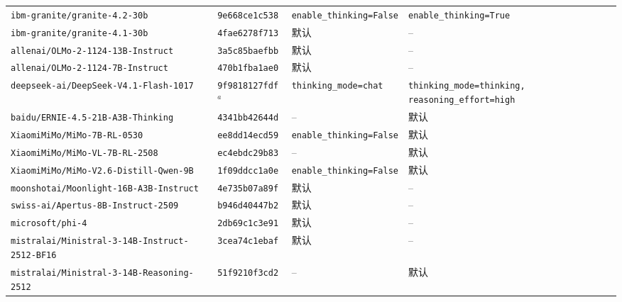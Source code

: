 \begin{table}[htbp]
\begin{tabular}{llp{3.2cm}p{3.5cm}}
\texttt{ibm-granite/granite-4.2-30b} & \texttt{9e668ce1c538} & \texttt{enable\_thinking=False} & \texttt{enable\_thinking=True} \\
\texttt{ibm-granite/granite-4.1-30b} & \texttt{4fae6278f713} & 默认 & -- \\
\texttt{allenai/OLMo-2-1124-13B-Instruct} & \texttt{3a5c85baefbb} & 默认 & -- \\
\texttt{allenai/OLMo-2-1124-7B-Instruct} & \texttt{470b1fba1ae0} & 默认 & -- \\
\texttt{deepseek-ai/DeepSeek-V4.1-Flash-1017} & \texttt{9f9818127fdf}$^{a}$ & \texttt{thinking\_mode=chat} & \texttt{thinking\_mode=thinking, reasoning\_effort=high} \\
\texttt{baidu/ERNIE-4.5-21B-A3B-Thinking} & \texttt{4341bb42644d} & -- & 默认 \\
\texttt{XiaomiMiMo/MiMo-7B-RL-0530} & \texttt{ee8dd14ecd59} & \texttt{enable\_thinking=False} & 默认 \\
\texttt{XiaomiMiMo/MiMo-VL-7B-RL-2508} & \texttt{ec4ebdc29b83} & -- & 默认 \\
\texttt{XiaomiMiMo/MiMo-V2.6-Distill-Qwen-9B} & \texttt{1f09ddcc1a0e} & \texttt{enable\_thinking=False} & 默认 \\
\texttt{moonshotai/Moonlight-16B-A3B-Instruct} & \texttt{4e735b07a89f} & 默认 & -- \\
\texttt{swiss-ai/Apertus-8B-Instruct-2509} & \texttt{b946d40447b2} & 默认 & -- \\
\texttt{microsoft/phi-4} & \texttt{2db69c1c3e91} & 默认 & -- \\
\texttt{mistralai/Ministral-3-14B-Instruct-2512-BF16} & \texttt{3cea74c1ebaf} & 默认 & -- \\
\texttt{mistralai/Ministral-3-14B-Reasoning-2512} & \texttt{51f9210f3cd2} & -- & 默认 \\
\bottomrule
\end{tabular}
\end{table}

